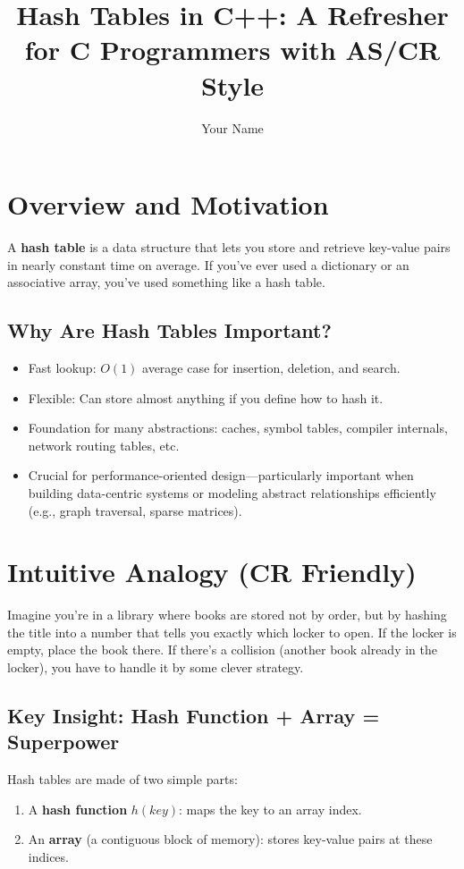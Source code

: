 \documentclass{article}
\title{Hash Tables in C++: A Refresher for C Programmers with AS/CR Style}
\author{Your Name}
\date{}
\begin{document}
\maketitle

\section*{Overview and Motivation}

A \textbf{hash table} is a data structure that lets you store and retrieve key-value pairs in nearly constant time on average. If you’ve ever used a dictionary or an associative array, you’ve used something like a hash table.

\subsection*{Why Are Hash Tables Important?}

\begin{itemize}
    \item Fast lookup: \(O(1)\) average case for insertion, deletion, and search.
    \item Flexible: Can store almost anything if you define how to hash it.
    \item Foundation for many abstractions: caches, symbol tables, compiler internals, network routing tables, etc.
    \item Crucial for performance-oriented design—particularly important when building data-centric systems or modeling abstract relationships efficiently (e.g., graph traversal, sparse matrices).
\end{itemize}

\section*{Intuitive Analogy (CR Friendly)}

Imagine you’re in a library where books are stored not by order, but by hashing the title into a number that tells you exactly which locker to open. If the locker is empty, place the book there. If there’s a collision (another book already in the locker), you have to handle it by some clever strategy.

\subsection*{Key Insight: Hash Function + Array = Superpower}

Hash tables are made of two simple parts:
\begin{enumerate}
    \item A \textbf{hash function} \( h(key) \): maps the key to an array index.
    \item An \textbf{array} (a contiguous block of memory): stores key-value pairs at these indices.
\end{enumerate}
\end{document}
